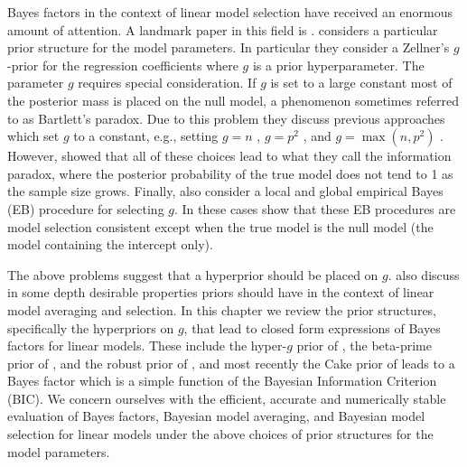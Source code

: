 Bayes factors in the context of linear model selection 
\citep{Zellner1980,
	Zellner1980b,
	Mitchell1988,
	George1993,
	Fernandez2001,
	Liang2008,
	Maruyama2011,
	Bayarri2012}
have received an enormous amount of attention. A landmark paper in this field
is \cite{Liang2008}.  \cite{Liang2008} considers a particular prior structure
for the model parameters.  In particular they consider a Zellner's $g$-prior
\citep{Zellner1980,Zellner1986} for the regression coefficients where $g$ is a
prior hyperparameter. The parameter $g$ requires special consideration. If $g$
is set to a large constant most of the posterior mass is placed on the null
model, a phenomenon sometimes referred to as Bartlett's paradox.  Due to this
problem they discuss previous approaches which set $g$ to a constant, e.g.,
setting $g=n$ \citep{Kass1995b},  $g=p^2$ \citep{Foster1994}, and
$g=\max(n,p^2)$ \citep{Fernandez2001}. However, \cite{Liang2008} showed that
all of these choices lead to what they call the information paradox, where the
posterior probability of the true model does not tend to 1 as the sample size
grows. Finally, \cite{Liang2008} also consider a local and global empirical
Bayes (EB) procedure for selecting $g$. In these cases \cite{Liang2008} show
that these EB procedures are model selection consistent except when the true
model is the null model (the model containing the intercept only). 

The above problems suggest that a hyperprior should be placed on $g$.
\cite{Bayarri2012} also discuss in some depth desirable properties priors
should have in the context of linear model averaging and selection.  In this
chapter we review the prior structures, specifically the hyperpriors on $g$,
that lead to closed form expressions of Bayes factors for linear models.  These
include the hyper-$g$ prior of \cite{Liang2008}, the beta-prime prior of
\cite{Maruyama2011}, and the robust prior of \cite{Bayarri2012}, and most
recently the Cake prior of \cite{OrmerodEtal2017} leads to a Bayes factor which
is a simple function of the Bayesian Information Criterion (BIC). We concern
ourselves with the efficient, accurate and numerically stable evaluation of
Bayes factors, Bayesian model averaging, and Bayesian model selection  for
linear models under the above choices of prior structures for the model
parameters.



